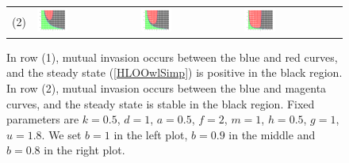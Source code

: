 \documentclass[12pt]{UOthesis}
\theoremstyle{remarkstyle}
\begin{document}
\begin{figure}[h!]
\begin{tabular}{m{0.07cm} m{4.5cm}  m{4.5cm}  m{4.5cm}}
		(2) & \includegraphics[width=0.33\textwidth]{HLOOwlSimpPOMutualInvasionOnEigenvalues1.png} & \includegraphics[width=0.33\textwidth]{HLOOwlSimpPOMutualInvasionOnEigenvalues2.png} & \includegraphics[width=0.33\textwidth]{HLOOwlSimpPOMutualInvasionOnEigenvalues3.png}\\
	\end{tabular}
	\caption[Mutual invasion and coexistence in the simplified owl model (periodic orbit)]{In row (1), mutual invasion occurs between the blue and red curves, and the steady state (\ref{HLOOwlSimp}) is positive in the black region. In row (2), mutual invasion occurs between the blue and magenta curves, and the steady state is stable in the black region. Fixed parameters are $k=0.5$, $d=1$, $a=0.5$, $f=2$, $m=1$, $h=0.5$, $g=1$, $u=1.8$. We set $b=1$ in the left plot, $b=0.9$ in the middle and $b=0.8$ in the right plot.\label{HLOOwlSimpPOMutualInvasionOnSteadyStatesAndEigenvalues}}%
\end{figure}
\end{document}
